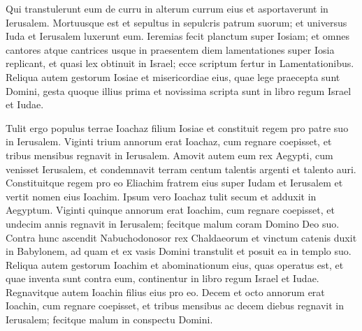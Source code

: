 \begin{biblechapter}
\begin{biblechapter}
\begin{biblechapter}
\begin{biblechapter}
\begin{biblechapter}
\begin{biblechapter}
\begin{biblechapter}
\begin{biblechapter}
\begin{biblechapter}
\begin{biblechapter}
\begin{biblechapter}
\begin{biblechapter}
\begin{biblechapter}
\begin{biblechapter}
\begin{biblechapter}
\begin{biblechapter}
\begin{biblechapter}
\begin{biblechapter}
\begin{biblechapter}
\begin{biblechapter}
\begin{biblechapter}
\begin{biblechapter}
\begin{biblechapter}
\begin{biblechapter}
\begin{biblechapter}
\begin{biblechapter}
\begin{biblechapter}
\begin{biblechapter}
\begin{biblechapter}
\begin{biblechapter}
\begin{biblechapter}
\begin{biblechapter}
\begin{biblechapter}
\begin{biblechapter}
\begin{biblechapter}
\verse Qui transtulerunt eum de curru in alterum currum eius et asportaverunt in Ierusalem. Mortuusque est et sepultus in sepulcris patrum suorum; et universus Iuda et Ierusalem luxerunt eum. 
\verse Ieremias fecit planctum super Iosiam; et omnes cantores atque cantrices usque in praesentem diem lamentationes super Iosia replicant, et quasi lex obtinuit in Israel; ecce scriptum fertur in Lamentationibus.
 \verse Reliqua autem gestorum Iosiae et misericordiae eius, quae lege praecepta sunt Domini, 
\verse gesta quoque illius prima et novissima scripta sunt in libro regum Israel et Iudae.
 
\begin{biblechapter}
\verse Tulit ergo populus terrae Ioachaz filium Iosiae et constituit regem pro patre suo in Ierusalem. 
\verse Viginti trium annorum erat Ioachaz, cum regnare coepisset, et tribus mensibus regnavit in Ierusalem. 
\verse Amovit autem eum rex Aegypti, cum venisset Ierusalem, et condemnavit terram centum talentis argenti et talento auri. 
\verse Constituitque regem pro eo Eliachim fratrem eius super Iudam et Ierusalem et vertit nomen eius Ioachim. Ipsum vero Ioachaz tulit secum et adduxit in Aegyptum.
 \verse Viginti quinque annorum erat Ioachim, cum regnare coepisset, et undecim annis regnavit in Ierusalem; fecitque malum coram Domino Deo suo. 
\verse Contra hunc ascendit Nabuchodonosor rex Chaldaeorum et vinctum catenis duxit in Babylonem, 
 \verse ad quam et ex vasis Domini transtulit et posuit ea in templo suo.
 \verse Reliqua autem gestorum Ioachim et abominationum eius, quas operatus est, et quae inventa sunt contra eum, continentur in libro regum Israel et Iudae. Regnavitque autem Ioachin filius eius pro eo.
 \verse Decem et octo annorum erat Ioachin, cum regnare coepisset, et tribus mensibus ac decem diebus regnavit in Ierusalem; fecitque malum in conspectu Domini. 

\end{biblechapter}
\end{biblechapter}
\end{biblechapter}
\end{biblechapter}
\end{biblechapter}
\end{biblechapter}
\end{biblechapter}
\end{biblechapter}
\end{biblechapter}
\end{biblechapter}
\end{biblechapter}
\end{biblechapter}
\end{biblechapter}
\end{biblechapter}
\end{biblechapter}
\end{biblechapter}
\end{biblechapter}
\end{biblechapter}
\end{biblechapter}
\end{biblechapter}
\end{biblechapter}
\end{biblechapter}
\end{biblechapter}
\end{biblechapter}
\end{biblechapter}
\end{biblechapter}
\end{biblechapter}
\end{biblechapter}
\end{biblechapter}
\end{biblechapter}
\end{biblechapter}
\end{biblechapter}
\end{biblechapter}
\end{biblechapter}
\end{biblechapter}
\end{biblechapter}
